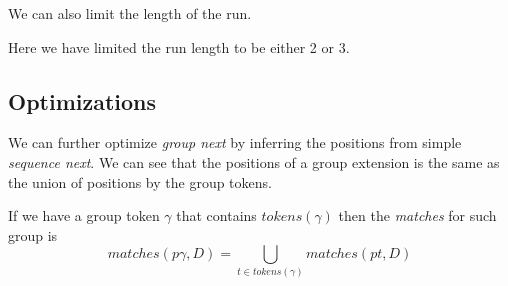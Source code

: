 \begin{figure}[H]
	
\end{figure}

We can also limit the length of the run.

\begin{figure}[H]
	
\end{figure}

Here we have limited the run length to be either 2 or 3.

\subsection{Optimizations}

We can further optimize \emph{group next} by inferring the positions from simple \emph{sequence next}. We can see that the positions of a group extension is the same as the union of positions by the group tokens.

If we have a group token $\gamma$ that contains $tokens(\gamma)$ then the \emph{matches} for such group is $$matches(p\gamma, D) = \bigcup_{t \in tokens(\gamma)} matches(pt, D) $$